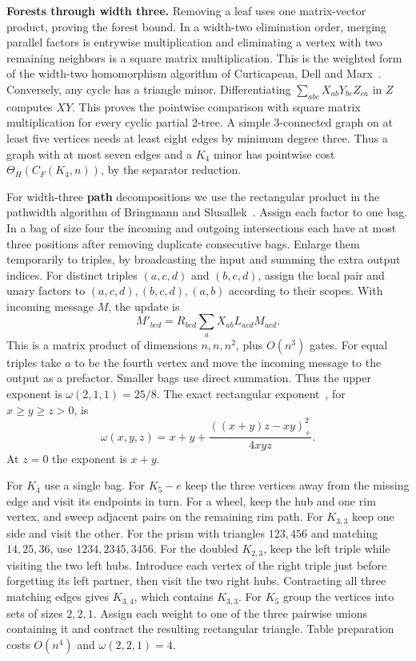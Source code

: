 \documentclass[11pt,letterpaper]{article}
\begin{document}
\textbf{Forests through width three.} Removing a leaf uses one matrix-vector product, proving the forest bound. In a width-two elimination order, merging parallel factors is entrywise multiplication and eliminating a vertex with two remaining neighbors is a square matrix multiplication. This is the weighted form of the width-two homomorphism algorithm of Curticapean, Dell and Marx~\cite[Theorem~1.7, full version]{cdm}. Conversely, any cycle has a triangle minor. Differentiating \(\sum_{abc}X_{ab}Y_{bc}Z_{ca}\) in \(Z\) computes \(XY\). This proves the pointwise comparison with square matrix multiplication for every cyclic partial 2-tree. A simple 3-connected graph on at least five vertices needs at least eight edges by minimum degree three. Thus a graph with at most seven edges and a \(K_4\) minor has pointwise cost \(\Theta_H(C_F(K_4,n))\), by the separator reduction.

For width-three \textbf{path} decompositions we use the rectangular product in the pathwidth algorithm of Bringmann and Slusallek~\cite[Theorem~8, full version]{bringmann-slusallek}. Assign each factor to one bag. In a bag of size four the incoming and outgoing intersections each have at most three positions after removing duplicate consecutive bags. Enlarge them temporarily to triples, by broadcasting the input and summing the extra output indices. For distinct triples \((a,c,d)\) and \((b,c,d)\), assign the local pair and unary factors to \((a,c,d),(b,c,d),(a,b)\) according to their scopes. With incoming message \(M\), the update is
\[
 M'_{bcd}=R_{bcd}\sum_a X_{ab} L_{acd} M_{acd}.
\]
This is a matrix product of dimensions \(n,n,n^2\), plus \(O(n^3)\) gates. For equal triples take \(a\) to be the fourth vertex and move the incoming message to the output as a prefactor. Smaller bags use direct summation. Thus the upper exponent is \(\omega(2,1,1)=25/8\). The exact rectangular exponent~\cite{matrix-exponent}, for \(x\ge y\ge z>0\), is
\[
 \omega(x,y,z)=x+y+\frac{((x+y)z-xy)_+^2}{4xyz}.
\]
At \(z=0\) the exponent is \(x+y\).

For \(K_4\) use a single bag. For \(K_5-e\) keep the three vertices away from the missing edge and visit its endpoints in turn. For a wheel, keep the hub and one rim vertex, and sweep adjacent pairs on the remaining rim path. For \(K_{3,3}\) keep one side and visit the other. For the prism with triangles \(123,456\) and matching \(14,25,36\), use \(1234,2345,3456\). For the doubled \(K_{2,3}\), keep the left triple while visiting the two left hubs. Introduce each vertex of the right triple just before forgetting its left partner, then visit the two right hubs. Contracting all three matching edges gives \(K_{3,4}\), which contains \(K_{3,3}\). For \(K_5\) group the vertices into sets of sizes \(2,2,1\). Assign each weight to one of the three pairwise unions containing it and contract the resulting rectangular triangle. Table preparation costs \(O(n^4)\) and \(\omega(2,2,1)=4\).
\end{document}
